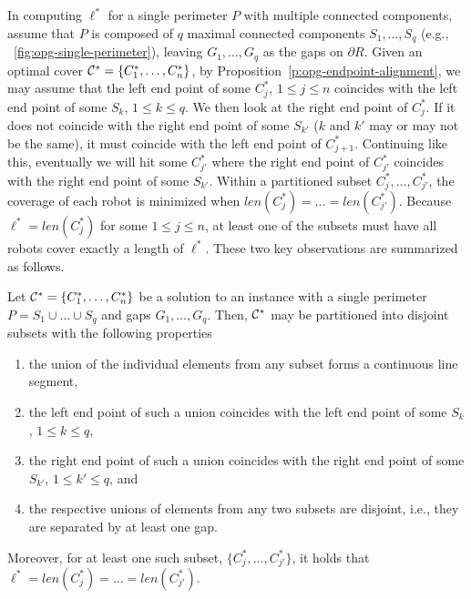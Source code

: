 In computing $\ell^*$ for a single perimeter $P$ with multiple connected 
components, assume that $P$ is composed of $q$ maximal connected 
components $S_1, \ldots, S_q$ (e.g., ~\ref{fig:opg-single-perimeter}),
leaving $G_1, \ldots, G_q$ as the gaps on $\partial R$. Given an 
optimal cover $\mathcal C^* = \{C_1^*, \ldots, C_n^*\}$, by 
Proposition~\ref{p:opg-endpoint-alignment}, we may assume that the left
end point of some $C_j^*$, $1 \le j \le n$ coincides with the left 
end point of some $S_k$, $1 \le k \le q$. We then look at the right 
end point of $C_j^*$. If it does not coincide with the right end point 
of some $S_{k'}$ ($k$ and $k'$ may or may not be the same), it must 
coincide with the left end point of $C_{j+1}^*$. Continuing like this, 
eventually we will hit some $C_{j'}^*$ where the right end point of 
$C_{j'}^*$ coincides with the right end point of some $S_{k'}$. 
Within a partitioned subset $C_j^*, \ldots, C_{j'}^*$, the coverage of 
each robot is minimized when $len(C_j^*) = \ldots = len(C_{j'}^*)$. 
Because $\ell^* = len(C_j^*)$ for some $1 \le j \le n$, at least one 
of the subsets must have all robots cover exactly a length of $\ell^*$. 
These two key observations are summarized as follows. 

\vspace*{-1mm}
\begin{theorem}\label{t:opg-optimal-partition}
Let $\mathcal C^* = \{C_1^*, \ldots, C_n^*\}$ be a solution to an \opg instance
with a single perimeter $P = S_1\cup \ldots\cup S_q$ and gaps $G_1, \ldots, 
G_q$. Then, $\mathcal C^*$ may be partitioned into disjoint subsets with
the following properties
\begin{enumerate}
\item the union of the individual elements from any subset forms a 
continuous line segment, 
\item the left end point of such a union coincides with the left end 
point of some $S_k$, $1 \le k \le q$, 
\item the right end point of such a union coincides with the right end 
point of some $S_{k'}$, $1 \le k' \le q$,  and
\item the respective unions of elements from any two subsets are 
disjoint, i.e., they are separated by at least one gap. 
\end{enumerate}
Moreover, for at least one such subset, $\{C_j^*, \ldots, C_{j'}^*\}$, 
it holds that $\ell^* = len(C_j^*) = \ldots = len(C_{j'}^*)$. 
\vspace*{-1mm}
\end{theorem}

